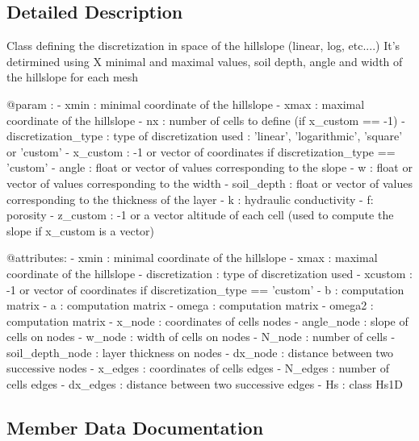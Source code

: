 \subsection{Detailed Description}
\begin{DoxyVerb}    Class defining the discretization in space of the hillslope (linear, log, etc....)
    It's detirmined using X minimal and maximal values, soil depth, angle and width
    of the hillslope for each mesh

    @param :
      - xmin : minimal coordinate of the hillslope
      - xmax : maximal coordinate of the hillslope
      - nx : number of cells to define (if x_custom == -1)
      - discretization_type : type of discretization used : 'linear', 'logarithmic',
          'square' or 'custom'
      - x_custom : -1 or vector of coordinates if discretization_type == 'custom'
      - angle : float or vector of values corresponding to the slope
      - w : float or vector of values corresponding to the width
      - soil_depth : float or vector of values corresponding to the thickness of the layer
      - k : hydraulic conductivity
      - f: porosity
      - z_custom : -1 or a vector altitude of each cell (used to compute the slope
           if x_custom is a vector)

    @attributes:
      - xmin : minimal coordinate of the hillslope
      - xmax : maximal coordinate of the hillslope
      - discretization : type of discretization used
      - xcustom : -1 or vector of coordinates if discretization_type == 'custom'
      - b : computation matrix
      - a : computation matrix
      - omega : computation matrix
      - omega2 : computation matrix
      - x_node : coordinates of cells nodes
      - angle_node : slope of cells on nodes
      - w_node : width of cells on nodes
      - N_node : number of cells
      - soil_depth_node : layer thickness on nodes
      - dx_node : distance between two successive nodes
      - x_edges : coordinates of cells edges
      - N_edges : number of cells edges
      - dx_edges : distance between two successive edges
      - Hs : class Hs1D
\end{DoxyVerb}
 

\subsection{Member Data Documentation}
\hypertarget{class_space_discretization_1_1_space_discretization_a09c1380b2ad5b4b86e9bb5761a9bfb9f}{}\label{class_space_discretization_1_1_space_discretization_a09c1380b2ad5b4b86e9bb5761a9bfb9f} 
